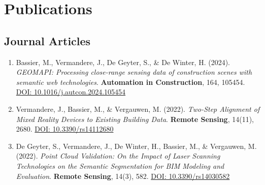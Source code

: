\chapter{Publications}\label{ch:publications}

\section*{Journal Articles}
\begin{enumerate}
    

    \item Bassier, M., Vermandere, J., De Geyter, S., \& De Winter, H. (2024). \textit{GEOMAPI: Processing close-range sensing data of construction scenes with semantic web technologies}. \textbf{Automation in Construction}, 164, 105454. \href{https://doi.org/10.1016/j.autcon.2024.105454}{DOI: 10.1016/j.autcon.2024.105454}
    
    \item Vermandere, J., Bassier, M., \& Vergauwen, M. (2022). \textit{Two-Step Alignment of Mixed Reality Devices to Existing Building Data}. \textbf{Remote Sensing}, 14(11), 2680. \href{https://doi.org/10.3390/rs14112680}{DOI: 10.3390/rs14112680}
    
    \item De Geyter, S., Vermandere, J., De Winter, H., Bassier, M., \& Vergauwen, M. (2022). \textit{Point Cloud Validation: On the Impact of Laser Scanning Technologies on the Semantic Segmentation for BIM Modeling and Evaluation}. \textbf{Remote Sensing}, 14(3), 582. \href{https://doi.org/10.3390/rs14030582}{DOI: 10.3390/rs14030582}

\end{enumerate}

